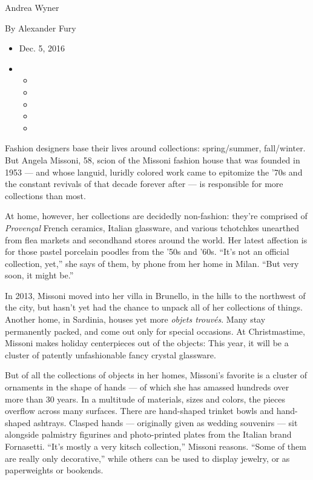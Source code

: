 Andrea Wyner

By Alexander Fury

\begin{itemize}
\item
  Dec. 5, 2016
\item
  \begin{itemize}
  \item
  \item
  \item
  \item
  \item
  \end{itemize}
\end{itemize}

Fashion designers base their lives around collections: spring/summer,
fall/winter. But Angela Missoni, 58, scion of the Missoni fashion house
that was founded in 1953 --- and whose languid, luridly colored work
came to epitomize the '70s and the constant revivals of that decade
forever after --- is responsible for more collections than most.

At home, however, her collections are decidedly non-fashion: they're
comprised of \emph{Provençal} French ceramics, Italian glassware, and
various tchotchkes unearthed from flea markets and secondhand stores
around the world. Her latest affection is for those pastel porcelain
poodles from the '50s and '60s. ``It's not an official collection,
yet,'' she says of them, by phone from her home in Milan. ``But very
soon, it might be.''

In 2013, Missoni moved into her villa in Brunello, in the hills to the
northwest of the city, but hasn't yet had the chance to unpack all of
her collections of things. Another home, in Sardinia, houses yet more
\emph{objets trouvés}. Many stay permanently packed, and come out only
for special occasions. At Christmastime, Missoni makes holiday
centerpieces out of the objects: This year, it will be a cluster of
patently unfashionable fancy crystal glassware.

But of all the collections of objects in her homes, Missoni's favorite
is a cluster of ornaments in the shape of hands --- of which she has
amassed hundreds over more than 30 years. In a multitude of materials,
sizes and colors, the pieces overflow across many surfaces. There are
hand-shaped trinket bowls and hand-shaped ashtrays. Clasped hands ---
originally given as wedding souvenirs --- sit alongside palmistry
figurines and photo-printed plates from the Italian brand Fornasetti.
``It's mostly a very kitsch collection,'' Missoni reasons. ``Some of
them are really only decorative,'' while others can be used to display
jewelry, or as paperweights or bookends.

